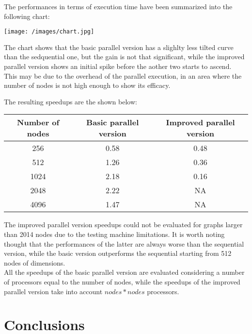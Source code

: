 \documentclass[
	a4paper, %
	12pt, %
]{class}
\begin{document}
The performances in terms of execution time have been summarized into the following chart:

\begin{center}
    \texttt{[image: /images/chart.jpg]}
\end{center}

The chart shows that the basic parallel version has a slighlty less tilted curve than the sedquential one, but the gain is not
that significant, while the improved parallel version shows an initial spike before the aother two starts to ascend. \\

This may be due to the overhead of the parallel execution, in an area where the number of nodes is not high enough to show its efficacy.
\newpage

The resulting speedups are the shown below:

\begin{center}
    \begin{tabular}{ |c|c|c| }
    \hline
    \textbf{Number of nodes} & \textbf{Basic parallel version} & \textbf{Improved parallel version} \\ \hline
    256 & 0.58  & 0.48 \\ \hline
    512 & 1.26 & 0.36 \\ \hline
    1024 & 2.18 & 0.16 \\ \hline
    2048 & 2.22 & NA \\ \hline
    4096 & 1.47 & NA \\ \hline
    \end{tabular}
\end{center}

The improved parallel version speedups could not be evaluated for graphs larger than 2014 nodes due to the testing machine
limitations. It is worth noting thought that the performances of the latter are always worse than the sequential version, while the basic
version outperforms the sequential starting from 512 nodes of dimensions. \\

All the speedups of the basic parallel version are evaluated considering a number of processors equal to the number of nodes, while the speedups
of the improved parallel version take into account $nodes * nodes$ processors.

\section{Conclusions}
\end{document}
